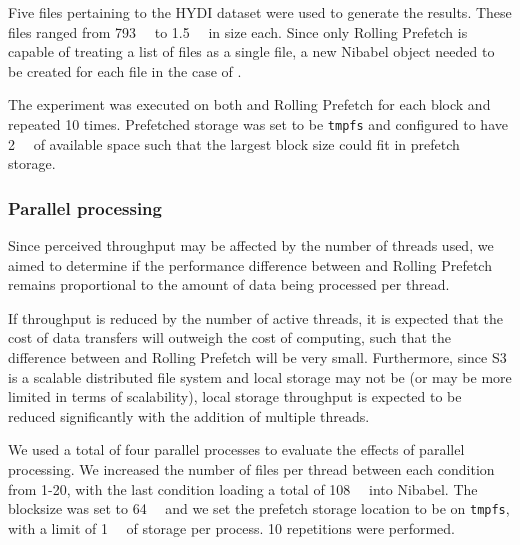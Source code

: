 Five files pertaining to the HYDI dataset were used to generate the results.
These files ranged from \SI{793}{\mebi\byte} to
\SI{1.5}{\gibi\byte} in size each. Since only Rolling Prefetch is capable of treating a list of files as a single file, a new
Nibabel object needed to be created for each file in the case of \sfs.

The experiment was executed on both \sfs and Rolling Prefetch for each block and repeated 10 times.
Prefetched storage was set to be \texttt{tmpfs} and
configured to have \SI{2}{\gibi\byte} of available space such that the largest block size could fit in prefetch
storage.

\subsubsection{Parallel processing}\label{exp:parallel}

Since perceived
throughput may be affected by the number of threads used, we aimed to determine if the performance difference
between \sfs and Rolling Prefetch remains proportional to the amount of data being processed per thread. 

If throughput is reduced by the number of active threads, it is expected that 
the cost of data transfers will outweigh the cost of computing, such that the difference between \sfs and Rolling Prefetch will
be very small. Furthermore, since S3 is a scalable distributed file system and local storage may not be (or may be more limited in terms of scalability), local storage
throughput is expected to be reduced significantly with the addition of multiple threads. 

We used a total of four parallel processes to evaluate the effects of parallel processing. We increased the number of
files per thread between each condition from 1-20, with the last condition loading
a total of \SI{108}{\gibi\byte} into Nibabel. The blocksize was set to \SI{64}{\mebi\byte} and we set the prefetch
storage location to be on \texttt{tmpfs}, with a limit of \SI{1}{\gibi\byte} of storage per process. 10 repetitions were
performed.

